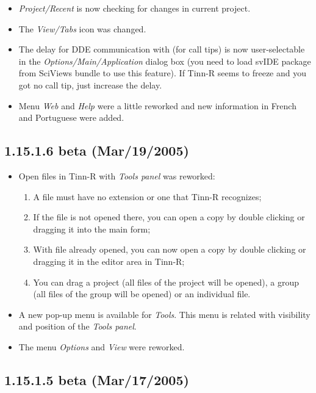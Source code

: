 \begin{itemize}
  \item \textit{Project/Recent} is now checking for changes in current project.
  \item The \textit{View/Tabs} icon was changed.
  \item The delay for DDE communication with \RR{} (for call tips) is now user-selectable in the
    \textit{Options/Main/Application} dialog box (you need to load svIDE package from SciViews bundle to use this feature).
    If Tinn-R seems to freeze and you got no call tip, just increase the delay.
  \item Menu \textit{Web} and \textit{Help} were a little reworked and new information in French and Portuguese were added.
\end{itemize}


\subsection{1.15.1.6 beta (Mar/19/2005)}

\begin{itemize}
  \item Open files in Tinn-R with \textit{Tools panel} was reworked:
    \begin{enumerate}
      \item A file must have no extension or one that Tinn-R recognizes;
      \item If the file is not opened there, you can open a copy by double clicking or dragging it into the main form;
      \item With file already opened, you can now open a copy by double clicking or dragging it in the editor area
        in Tinn-R;
      \item You can drag a project (all files of the project will be opened), a group (all files of the group will
        be opened) or an individual file.
    \end{enumerate}
  \item A new pop-up menu is available for \textit{Tools}. This menu is related with visibility and position
    of the \textit{Tools panel}.
  \item The menu \textit{Options} and \textit{View} were reworked.
\end{itemize}


\subsection{1.15.1.5 beta (Mar/17/2005)}

